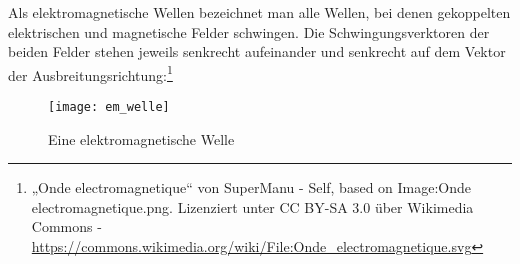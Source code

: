 




%
%	





Als elektromagnetische Wellen bezeichnet man alle Wellen, bei denen gekoppelten elektrischen und magnetische Felder schwingen. Die Schwingungsverktoren der beiden Felder stehen jeweils senkrecht aufeinander und senkrecht auf dem Vektor der Ausbreitungsrichtung:\footnote{„Onde electromagnetique“ von SuperManu - Self, based on Image:Onde electromagnetique.png. Lizenziert unter CC BY-SA 3.0 über Wikimedia Commons - \url{https://commons.wikimedia.org/wiki/File:Onde_electromagnetique.svg}}

\begin{figure}[h!]
	\center
	\texttt{[image: em\_welle]}
	\caption{Eine elektromagnetische Welle}
\end{figure}

